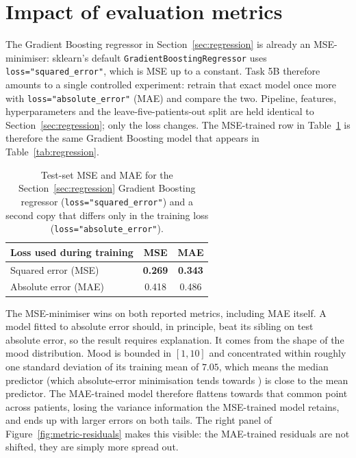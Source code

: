 
\section{Impact of evaluation metrics}\label{sec:metric-impact}

The Gradient Boosting regressor in Section~\ref{sec:regression} is already an MSE-minimiser: sklearn's default \texttt{GradientBoostingRegressor} uses \texttt{loss="squared\_error"}, which is MSE up to a constant. Task 5B therefore amounts to a single controlled experiment: retrain that exact model once more with \texttt{loss="absolute\_error"} (MAE) and compare the two. Pipeline, features, hyperparameters and the leave-five-patients-out split are held identical to Section~\ref{sec:regression}; only the loss changes. The MSE-trained row in Table~\ref{tab:metric-impact} is therefore the same Gradient Boosting model that appears in Table~\ref{tab:regression}.

\begin{table}[h]
\centering
\caption{Test-set MSE and MAE for the Section~\ref{sec:regression} Gradient Boosting regressor (\texttt{loss="squared\_error"}) and a second copy that differs only in the training loss (\texttt{loss="absolute\_error"}).}
\label{tab:metric-impact}
\small
\begin{tabular}{@{}lcc@{}}
\toprule
Loss used during training & MSE & MAE \\
\midrule
Squared error (MSE) & \textbf{0.269} & \textbf{0.343} \\
Absolute error (MAE) & 0.418 & 0.486 \\
\bottomrule
\end{tabular}
\end{table}

The MSE-minimiser wins on both reported metrics, including MAE itself. A model fitted to absolute error should, in principle, beat its sibling on test absolute error, so the result requires explanation. It comes from the shape of the mood distribution. Mood is bounded in $[1,10]$ and concentrated within roughly one standard deviation of its training mean of $7.05$, which means the median predictor (which absolute-error minimisation tends towards \cite{willmott2005advantages}) is close to the mean predictor. The MAE-trained model therefore flattens towards that common point across patients, losing the variance information the MSE-trained model retains, and ends up with larger errors on both tails. The right panel of Figure~\ref{fig:metric-residuals} makes this visible: the MAE-trained residuals are not shifted, they are simply more spread out.

